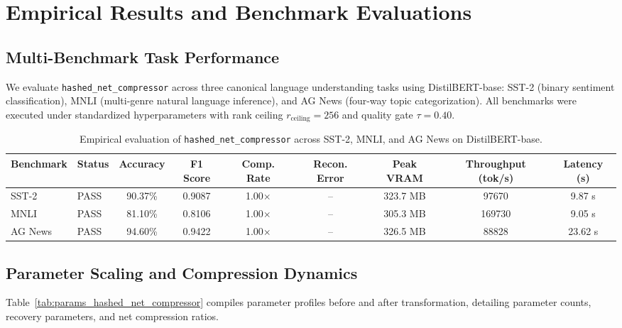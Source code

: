 \section{Empirical Results and Benchmark Evaluations}
\label{sec:results}

\subsection{Multi-Benchmark Task Performance}
We evaluate \texttt{hashed\_net\_compressor} across three canonical language understanding tasks using DistilBERT-base: SST-2 (binary sentiment classification), MNLI (multi-genre natural language inference), and AG News (four-way topic categorization). All benchmarks were executed under standardized hyperparameters with rank ceiling $r_{\mathrm{ceiling}} = 256$ and quality gate $\tau = 0.40$.

\begin{table}[t]
\centering
\small
\begin{tabular}{llccccccc}
\toprule
\textbf{Benchmark} & \textbf{Status} & \textbf{Accuracy} & \textbf{F1 Score} & \textbf{Comp. Rate} & \textbf{Recon. Error} & \textbf{Peak VRAM} & \textbf{Throughput (tok/s)} & \textbf{Latency (s)} \\
\midrule
SST-2 & PASS & 90.37\% & 0.9087 & 1.00$\times$ & -- & 323.7 MB & 97670 & 9.87 s \\
MNLI & PASS & 81.10\% & 0.8106 & 1.00$\times$ & -- & 305.3 MB & 169730 & 9.05 s \\
AG News & PASS & 94.60\% & 0.9422 & 1.00$\times$ & -- & 326.5 MB & 88828 & 23.62 s \\
\bottomrule
\end{tabular}
\caption{Empirical evaluation of \texttt{hashed\_net\_compressor} across SST-2, MNLI, and AG News on DistilBERT-base.}
\label{tab:results_hashed_net_compressor}
\end{table}

\subsection{Parameter Scaling and Compression Dynamics}
Table~\ref{tab:params_hashed_net_compressor} compiles parameter profiles before and after transformation, detailing parameter counts, recovery parameters, and net compression ratios.

